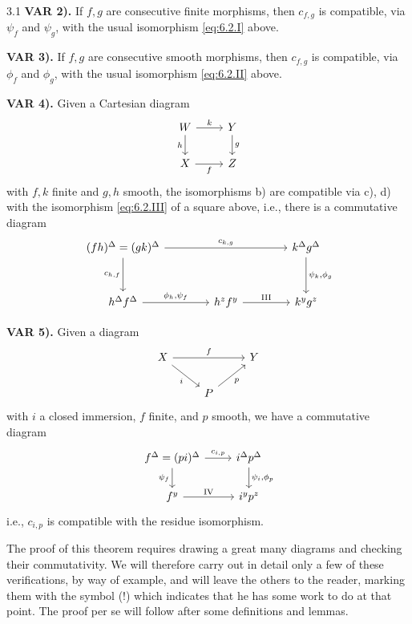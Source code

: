 \begin{booktheorem}{3.1}
\medskip{}\label{var:6.3.2}\noindent\textbf{VAR 2).} If $f,g$ are consecutive finite morphisms, then $c_{f,g}$ is compatible, via $\psi_f$ and $\psi_g$, with the usual isomorphism \eqref{eq:6.2.I} above.

\medskip{}\label{var:6.3.3}\noindent\textbf{VAR 3).} If $f,g$ are consecutive smooth morphisms, then $c_{f,g}$ is compatible, via $\phi_f$ and $\phi_g$, with the usual isomorphism \eqref{eq:6.2.II} above.

\medskip{}\label{var:6.3.4}\noindent\textbf{VAR 4).} Given a Cartesian diagram
\[
\begin{tikzcd}
	W \arrow[r, "k"] \arrow[d, "h"'] & Y \arrow[d, "g"] \\
	X \arrow[r, "f"'] & Z
\end{tikzcd}
\]
with $f,k$ finite and $g,h$ smooth, the isomorphisms b) are compatible via c), d) with the isomorphism \eqref{eq:6.2.III} of a square above, i.e., there is a commutative diagram
\[
\begin{tikzcd}[row sep=3em, column sep=4em]
	(fh)^\Delta = (gk)^\Delta
	\arrow[rr, "c_{k,g}"]
	\arrow[d, "c_{h,f}"']
	&& k^\Delta g^\Delta
	\arrow[d, "{\psi_k, \phi_g}"] \\
	h^\Delta f^\Delta
	\arrow[r, "{\phi_h, \psi_f}"]
	& h^z f^y
	\arrow[r, "\text{III}"]
	& k^y g^z
\end{tikzcd}
\]

\medskip{}\label{var:6.3.5}\noindent\textbf{VAR 5).} Given a diagram
\[
\begin{tikzcd}
X \ar[rr,"f"] \ar[dr,"i"'] & & Y \\
& P \ar[ur,"p"']
\end{tikzcd}
\]
with $i$ a closed immersion, $f$ finite, and $p$ smooth, we have a commutative diagram
\[
\begin{tikzcd}
f^{\Delta}=(pi)^{\Delta} \ar[r,"c_{i,p}"] \ar[d,"\psi_f"'] & i^{\Delta}p^{\Delta}\ar[d,"{\psi_i,\phi_p}"] \\
f^{y} \ar[r,"\mathrm{IV}"] & i^{y}p^{z}
\end{tikzcd}
\]
i.e., $c_{i,p}$ is compatible with the residue isomorphism.
\end{booktheorem}

The proof of this theorem requires drawing a great many diagrams and checking their commutativity. We will therefore carry out in detail only a few of these verifications, by way of example, and will leave the others to the reader, marking them with the symbol (!) which indicates that he has some work to do at that point. The proof per se will follow after some definitions and lemmas.

